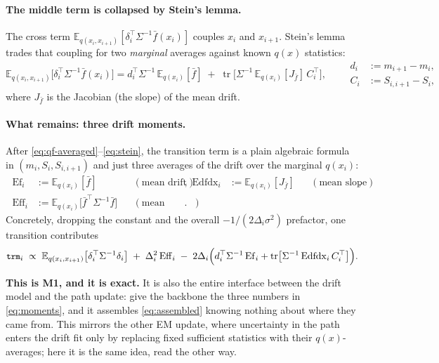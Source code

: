 \documentclass[11pt]{article}
\newcommand{\E}{\mathbb{E}}
\newcommand{\Eqx}{\E_{q(x_i)}}
\newcommand{\Eqxx}{\E_{q(x_i,x_{i+1})}}
\newcommand{\tr}{\operatorname{tr}}
\newcommand{\code}[1]{\texttt{\small #1}}
\begin{document}
\paragraph{The middle term is collapsed by Stein's lemma.}
The cross term $\Eqxx[\delta_i^\top\Sigma^{-1}\bar f(x_i)]$ couples $x_i$
and $x_{i+1}$. Stein's lemma trades that coupling for two \emph{marginal}
averages against known $q(x)$ statistics:
\begin{equation}
\Eqxx\bigl[\delta_i^\top\Sigma^{-1}\bar f(x_i)\bigr]
= d_i^\top\Sigma^{-1}\,\Eqx[\bar f]
\;+\; \tr\!\bigl[\Sigma^{-1}\,\Eqx[J_{\bar f}]\,C_i^\top\bigr],
\qquad
\begin{aligned}
d_i &:= m_{i+1}-m_i,\\
C_i &:= S_{i,i+1}-S_i,
\end{aligned}
\label{eq:stein}
\end{equation}
where $J_{\bar f}$ is the Jacobian (the slope) of the mean drift.

\paragraph{What remains: three drift moments.}
After \eqref{eq:qf-averaged}--\eqref{eq:stein}, the transition term is a
plain algebraic formula in $(m_i,S_i,S_{i,i+1})$ and just three averages
of the drift over the marginal $q(x_i)$:
\begin{equation}
\boxed{\;
\begin{aligned}
\mathrm{Ef}_i &:= \Eqx[\bar f] && (\text{mean drift}), &
\mathrm{Edfdx}_i &:= \Eqx[J_{\bar f}] && (\text{mean slope}), \\
\mathrm{Eff}_i &:= \Eqx\bigl[\bar f^\top\Sigma^{-1}\bar f\bigr] && (\text{mean square}).
\end{aligned}
\;}
\label{eq:moments}
\end{equation}
Concretely, dropping the constant and the overall $-1/(2\Delta_i\sigma^2)$
prefactor, one transition contributes
\begin{equation}
\code{trm}_i \;\propto\;
\Eqxx\bigl[\delta_i^\top\Sigma^{-1}\delta_i\bigr]
\;+\;\Delta_i^2\,\mathrm{Eff}_i
\;-\;2\Delta_i\Bigl(d_i^\top\Sigma^{-1}\,\mathrm{Ef}_i
   + \tr\bigl[\Sigma^{-1}\,\mathrm{Edfdx}_i\,C_i^\top\bigr]\Bigr).
\label{eq:assembled}
\end{equation}

\medskip\noindent
\textbf{This is M1, and it is exact.} It is also the entire interface
between the drift model and the path update: give the backbone the three
numbers in \eqref{eq:moments}, and it assembles \eqref{eq:assembled}
knowing nothing about where they came from. This mirrors the other EM
update, where uncertainty in the path enters the drift fit only by
replacing fixed sufficient statistics with their $q(x)$-averages; here it
is the same idea, read the other way.
\end{document}
